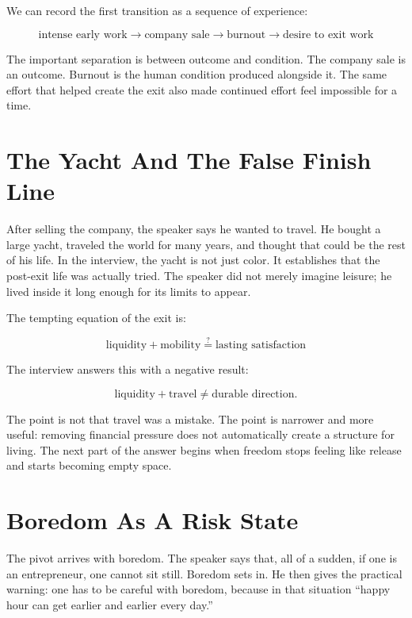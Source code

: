 We can record the first transition as a sequence of experience:

\begin{equation}
\text{intense early work}
\longrightarrow
\text{company sale}
\longrightarrow
\text{burnout}
\longrightarrow
\text{desire to exit work}
\end{equation}

The important separation is between outcome and condition. The company sale is an outcome. Burnout is the human condition produced alongside it. The same effort that helped create the exit also made continued effort feel impossible for a time.

\section{The Yacht And The False Finish Line}

After selling the company, the speaker says he wanted to travel. He bought a large yacht, traveled the world for many years, and thought that could be the rest of his life. In the interview, the yacht is not just color. It establishes that the post-exit life was actually tried. The speaker did not merely imagine leisure; he lived inside it long enough for its limits to appear.

The tempting equation of the exit is:

\begin{equation}
\text{liquidity} + \text{mobility}
\stackrel{?}{=}
\text{lasting satisfaction}
\end{equation}

The interview answers this with a negative result:

\begin{equation}
\text{liquidity} + \text{travel}
\neq
\text{durable direction}.
\end{equation}

The point is not that travel was a mistake. The point is narrower and more useful: removing financial pressure does not automatically create a structure for living. The next part of the answer begins when freedom stops feeling like release and starts becoming empty space.

\section{Boredom As A Risk State}

The pivot arrives with boredom. The speaker says that, all of a sudden, if one is an entrepreneur, one cannot sit still. Boredom sets in. He then gives the practical warning: one has to be careful with boredom, because in that situation ``happy hour can get earlier and earlier every day.''

